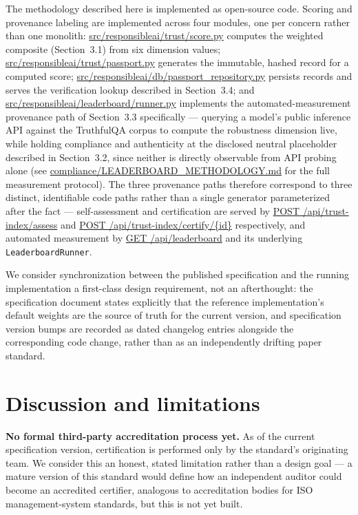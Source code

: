 \documentclass[11pt]{article}
\newcommand{\code}[1]{\url{#1}}
\begin{document}
The methodology described here is implemented as open-source code.
Scoring and provenance labeling are implemented across four modules,
one per concern rather than one monolith:
\code{src/responsibleai/trust/score.py} computes the weighted
composite (Section~3.1) from six dimension values;
\code{src/responsibleai/trust/passport.py} generates the immutable,
hashed record for a computed score;
\code{src/responsibleai/db/passport_repository.py} persists records
and serves the verification lookup described in Section~3.4; and
\code{src/responsibleai/leaderboard/runner.py} implements the
automated-measurement provenance path of Section~3.3 specifically ---
querying a model's public inference API against the TruthfulQA corpus
to compute the robustness dimension live, while holding compliance and
authenticity at the disclosed neutral placeholder described in
Section~3.2, since neither is directly observable from API probing
alone (see \code{compliance/LEADERBOARD_METHODOLOGY.md} for the
full measurement protocol). The three provenance paths therefore
correspond to three distinct, identifiable code paths rather than a
single generator parameterized after the fact --- self-assessment and
certification are served by \code{POST /api/trust-index/assess} and
\code{POST /api/trust-index/certify/{id}} respectively, and
automated measurement by \code{GET /api/leaderboard} and its
underlying \texttt{LeaderboardRunner}.

We consider synchronization between the published specification and
the running implementation a first-class design requirement, not an
afterthought: the specification document states explicitly that the
reference implementation's default weights are the source of truth
for the current version, and specification version bumps are recorded
as dated changelog entries alongside the corresponding code change,
rather than as an independently drifting paper standard.

\section{Discussion and limitations}

\textbf{No formal third-party accreditation process yet.} As of the
current specification version, certification is performed only by the
standard's originating team. We consider this an honest, stated
limitation rather than a design goal --- a mature version of this
standard would define how an independent auditor could become an
accredited certifier, analogous to accreditation bodies for ISO
management-system standards, but this is not yet built.
\end{document}
